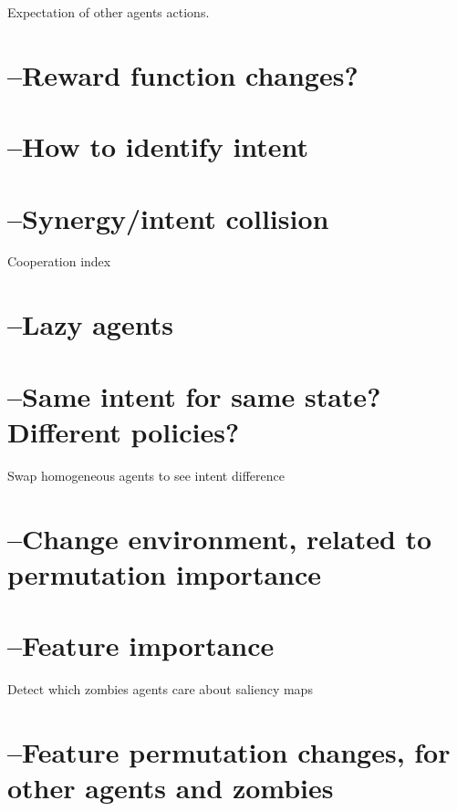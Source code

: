 \documentclass[UKenglish]{uiomasterthesis}
\begin{document}
Expectation of other agents actions.


\section{--Reward function changes?}

\section{--How to identify intent}

\section{--Synergy/intent collision}
Cooperation index

\section{--Lazy agents}

\section{--Same intent for same state? Different policies?}
Swap homogeneous agents to see intent difference

\section{--Change environment, related to permutation importance}

\section{--Feature importance}
Detect which zombies agents care about
saliency maps

\section{--Feature permutation changes, for other agents and zombies}

{}

\end{document}
